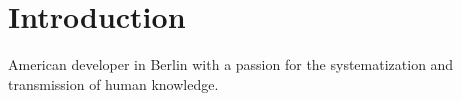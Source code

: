 
\section{Introduction}

{ American developer in Berlin with a passion for the systematization and transmission of human knowledge. }
